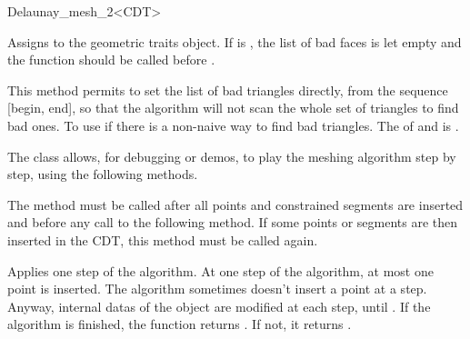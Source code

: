 \begin{ccRefClass}{Delaunay_mesh_2<CDT>}
\begin{ccAdvanced}
  { Assigns  to the geometric traits object. If
     is , the list of bad faces is
    let empty and the function  should be called before
    .}

                   { This method permits to set the list of bad triangles
                     directly, from the sequence [begin, end], so that the
                     algorithm will not scan the whole set of triangles to
                     find bad ones. To use if there is a non-naive way to
                     find bad triangles.  \ccPrecond The 
                     of  and  is .}

\end{ccAdvanced}


\begin{ccAdvanced}

The \ccRefName{} class allows, for debugging or demos, to play the
meshing algorithm step by step, using the following methods.

         { The method must be called after all points and constrained
           segments are inserted and before any call to the following
           method. If some points or segments are then inserted 
           in the CDT, this method must be called again. }

         { Applies one step of the algorithm. At one step of the algorithm,
           at most one point is inserted. The algorithm
           sometimes doesn't insert a point at a step. Anyway,
           internal datas of the \ccRefName{} object are modified at
           each step, until . If the algorithm
           is finished, the function returns . If not, it 
           returns .}

\end{ccAdvanced}

\end{ccRefClass}

